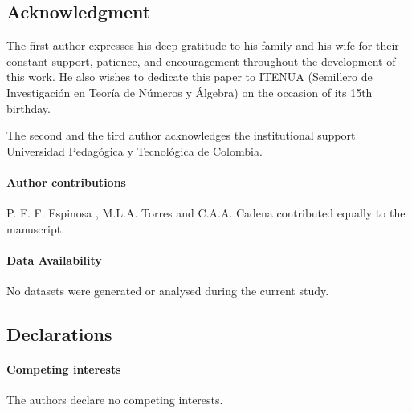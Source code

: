 \documentclass[11pt]{birkjour}
\theoremstyle{definition}
\theoremstyle{remark}
\numberwithin{equation}{section}
\begin{document}
\subsection*{Acknowledgment}
\noindent The first author expresses his deep gratitude to his family and his wife for their constant support, patience, and encouragement throughout the development of this work. He also wishes to dedicate this paper to ITENUA (Semillero de Investigación en Teoría de Números y Álgebra) on the occasion of its 15th birthday.\par \bigskip 

\noindent The second and the tird author acknowledges the institutional support Universidad Pedagógica y Tecnológica de Colombia.
\par \bigskip 
\paragraph{Author contributions} P. F. F. Espinosa , M.L.A. Torres and C.A.A. Cadena contributed equally to the manuscript.
\paragraph{Data Availability} No datasets were generated or analysed during the current study.
\subsection*{Declarations}
\paragraph{Competing interests} The authors declare no competing interests.
\end{document}
